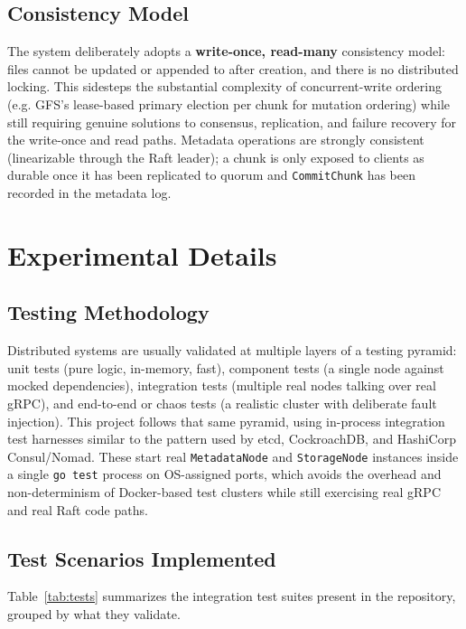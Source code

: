 \documentclass[12pt,a4paper]{report}
\begin{document}
\section{Consistency Model}

The system deliberately adopts a \textbf{write-once, read-many} consistency model: files cannot be updated or appended to after creation, and there is no distributed locking. This sidesteps the substantial complexity of concurrent-write ordering (e.g. GFS's lease-based primary election per chunk for mutation ordering) while still requiring genuine solutions to consensus, replication, and failure recovery for the write-once and read paths. Metadata operations are strongly consistent (linearizable through the Raft leader); a chunk is only exposed to clients as durable once it has been replicated to quorum and \texttt{CommitChunk} has been recorded in the metadata log.

\chapter{Experimental Details}

\section{Testing Methodology}

Distributed systems are usually validated at multiple layers of a testing pyramid: unit tests (pure logic, in-memory, fast), component tests (a single node against mocked dependencies), integration tests (multiple real nodes talking over real gRPC), and end-to-end or chaos tests (a realistic cluster with deliberate fault injection). This project follows that same pyramid, using in-process integration test harnesses similar to the pattern used by etcd, CockroachDB, and HashiCorp Consul/Nomad. These start real \texttt{MetadataNode} and \texttt{StorageNode} instances inside a single \texttt{go test} process on OS-assigned ports, which avoids the overhead and non-determinism of Docker-based test clusters while still exercising real gRPC and real Raft code paths.

\section{Test Scenarios Implemented}

Table~\ref{tab:tests} summarizes the integration test suites present in the repository, grouped by what they validate.
\end{document}

